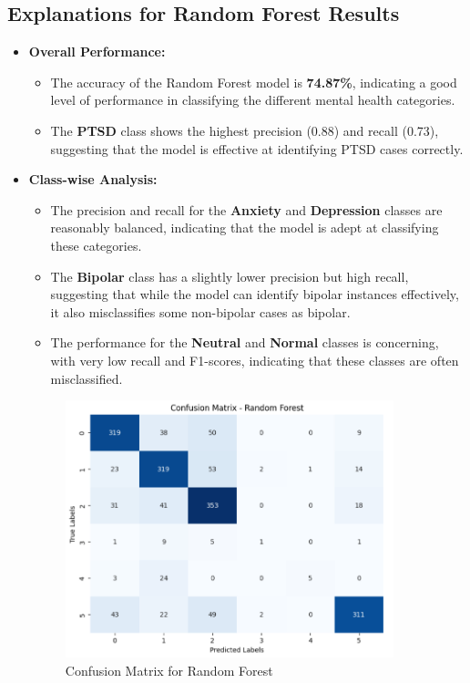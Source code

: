\subsection{Explanations for Random Forest Results}

\begin{itemize}
    \item \textbf{Overall Performance:}
    \begin{itemize}
        \item The accuracy of the Random Forest model is \textbf{74.87\%}, indicating a good level of performance in classifying the different mental health categories.
        \item The \textbf{PTSD} class shows the highest precision (0.88) and recall (0.73), suggesting that the model is effective at identifying PTSD cases correctly.
    \end{itemize}

    \item \textbf{Class-wise Analysis:}
    \begin{itemize}
        \item The precision and recall for the \textbf{Anxiety} and \textbf{Depression} classes are reasonably balanced, indicating that the model is adept at classifying these categories.
        \item The \textbf{Bipolar} class has a slightly lower precision but high recall, suggesting that while the model can identify bipolar instances effectively, it also misclassifies some non-bipolar cases as bipolar.
        \item The performance for the \textbf{Neutral} and \textbf{Normal} classes is concerning, with very low recall and F1-scores, indicating that these classes are often misclassified.
    \end{itemize}

    \begin{figure}[h!]  
    \centering
    \includegraphics[width=0.9\textwidth]{Images/Confusion Matrix RF.png}  
    \caption{Confusion Matrix for Random Forest}
    \label{Confusion Matrix RF}  %
    \end{figure}


\end{itemize}
